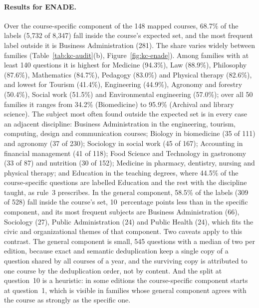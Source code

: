 \paragraph{Results for ENADE.} Over the course-specific component of the
148 mapped courses, 68.7\% of the labels (5,732 of 8,347) fall inside the
course's expected set, and the most frequent label outside it is Business
Administration (281). The share varies widely between families
(Table~\ref{tab:kc-audit}(b), Figure~\ref{fig:kc-enade}). Among families with
at least 140 questions it is highest for Medicine (94.3\%), Law (88.9\%),
Philosophy (87.6\%), Mathematics (84.7\%), Pedagogy (83.0\%) and Physical
therapy (82.6\%), and lowest for Tourism (41.4\%), Engineering (44.9\%),
Agronomy and forestry (50.4\%), Social work (51.5\%) and Environmental
engineering (57.0\%); over all 50 families it ranges from 34.2\%
(Biomedicine) to 95.9\% (Archival and library science). The subject most
often found outside the expected set is in every case an adjacent discipline:
Business Administration in the engineering, tourism, computing, design and
communication courses; Biology in biomedicine (35 of 111) and agronomy (37
of 230); Sociology in social work (45 of 167); Accounting in financial
management (41 of 118); Food Science and Technology in gastronomy (33 of 87)
and nutrition (30 of 152); Medicine in pharmacy, dentistry, nursing and
physical therapy; and Education in the teaching degrees, where 44.5\% of the
course-specific questions are labelled Education and the rest with the
discipline taught, as rule~3 prescribes. In the general component, 58.5\% of
the labels (309 of 528) fall inside the course's set, 10~percentage points
less than in the specific component, and its most frequent subjects are
Business Administration (66), Sociology (27), Public Administration (24) and
Public Health (24), which fits the civic and organizational themes of that
component. Two caveats apply to this contrast. The general component is
small, 545 questions with a median of two per edition, because exact and
semantic deduplication keep a single copy of a question shared by all
courses of a year, and the surviving copy is attributed to one course by the
deduplication order, not by content. And the split at question~10 is a
heuristic: in some editions the course-specific component starts at
question~1, which is visible in families whose general component agrees with
the course as strongly as the specific one.

